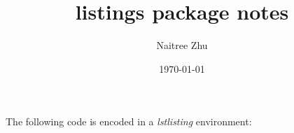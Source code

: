 \documentclass[a4paper]{article}
\title{listings package notes}
\author{Naitree Zhu}
\date{\today}
\begin{document}
\maketitle
The following code is encoded in a \emph{lstlisting} environment:
\
\end{document}
